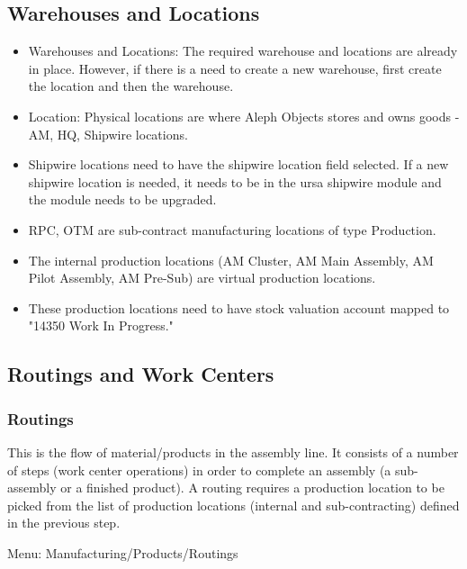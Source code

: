\subsection{Warehouses and Locations}
\begin{itemize}
\item Warehouses and Locations: The required warehouse and locations are already in place.  However, if there is a need to create a new warehouse, first create the location and then the warehouse.

\item Location: Physical locations are where Aleph Objects stores and owns goods - AM, HQ, Shipwire locations. 

\item Shipwire locations need to have the shipwire location field selected. If a new shipwire location is needed, it needs to be in the ursa shipwire module and the module needs to be upgraded.

\item RPC, OTM are sub-contract manufacturing locations of type Production. 

\item The internal production locations (AM Cluster, AM Main Assembly, AM Pilot Assembly, AM Pre-Sub) are virtual production locations. 

\item These production locations need to have stock valuation account mapped to "14350 Work In Progress."
\end{itemize}

\subsection{Routings and Work Centers}

\subsubsection{Routings}
This is the flow of material/products in the assembly line. It consists of a number of steps (work center operations) in order to complete an assembly (a sub-assembly or a finished product). A routing requires a production location to be picked from the list of production locations (internal and sub-contracting) defined in the previous step. 

Menu: Manufacturing/Products/Routings

